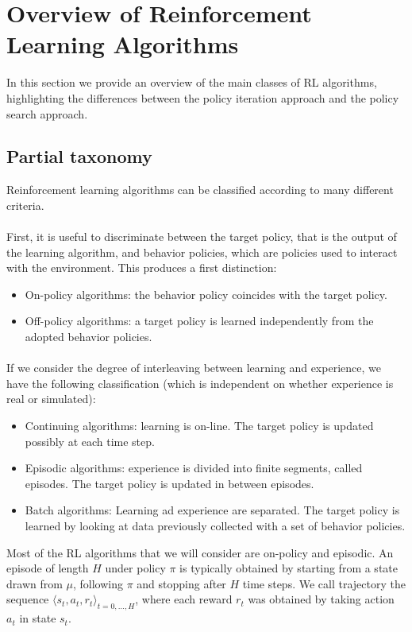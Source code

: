 \section{Overview of Reinforcement Learning Algorithms}\label{sec:overview}

In this section we provide an overview of the main classes of \ac{RL} algorithms, highlighting the differences between the policy iteration approach and the policy search approach.

\subsection{Partial taxonomy}
Reinforcement learning algorithms can be classified according to many different criteria.
\paragraph{} %
First, it is useful to discriminate between the target policy, that is the output of the learning algorithm, and behavior policies, which are policies used to interact with the environment. This produces a first distinction:
\begin{itemize}
\item On-policy algorithms: the behavior policy coincides with the target policy.
\item Off-policy algorithms: a target policy is learned independently from the adopted behavior policies. 
\end{itemize}
\paragraph{} %
If we consider the degree of interleaving between learning and experience, we have the following classification (which is independent on whether experience is real or simulated):
\begin{itemize}
\item Continuing algorithms: learning is on-line. The target policy is updated possibly at each time step.
\item Episodic algorithms: experience is divided into finite segments, called episodes. The target policy is updated in between episodes.
\item Batch algorithms: Learning ad experience are separated. The target policy is learned by looking at data previously collected with a set of behavior policies. 
\end{itemize}
Most of the \ac{RL} algorithms that we will consider are on-policy and episodic. An episode of length $H$ under policy $\pi$ is typically obtained by starting from a state drawn from $\mu$, following $\pi$ and stopping after $H$ time steps. We call trajectory the sequence $\langle s_t,a_t,r_t\rangle_{t=0,\dotsc,H}$, where each reward $r_t$ was obtained by taking action $a_t$ in state $s_t$.
